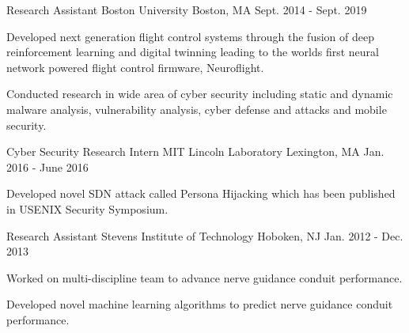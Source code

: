 


\begin{cventries}

  \cventry
    {Research Assistant} %
    {Boston University} %
    {Boston, MA} %
    {Sept. 2014 - Sept. 2019} %
    {
      \begin{cvitems} %
\item {Developed next generation flight control systems through the fusion of
deep reinforcement learning and digital twinning leading to the worlds first neural network powered flight control
firmware, Neuroflight.}
      \item {Conducted research in wide area of cyber security including static
and dynamic malware analysis, vulnerability analysis, cyber defense and attacks
and mobile security.}
      \end{cvitems}
    }

  \cventry
    {Cyber Security Research Intern } %
    {MIT Lincoln Laboratory} %
    {Lexington, MA} %
    {Jan. 2016 - June 2016} %
    {
      \begin{cvitems} %
      \item {Developed novel SDN attack called Persona Hijacking which has been published in USENIX Security Symposium.}
      \end{cvitems}
    }

  \cventry
    {Research Assistant} %
    {Stevens Institute of Technology} %
    {Hoboken, NJ} %
    {Jan. 2012 - Dec. 2013} %
    {
      \begin{cvitems} %
      \item {Worked on multi-discipline team to advance nerve guidance conduit performance.}
       \item {Developed novel machine learning algorithms to predict nerve guidance conduit performance. }
      \end{cvitems}
    }

\end{cventries}
